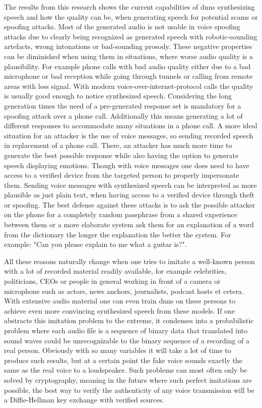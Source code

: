 The results from this research shows the current capabilities of \gls{dnn}s synthesizing speech and how the quality can be, when generating speech for potential scams or spoofing attacks. Most of the generated audio is not usable in voice spoofing attacks due to clearly being recognized as generated speech with robotic-sounding artefacts, wrong intonations or bad-sounding prosody. These negative properties can be diminished when using them in situations, where worse audio quality is a plausibility. For example phone calls with bad audio quality either due to a bad microphone or bad reception while going through tunnels or calling from remote areas with less signal. With modern voice-over-internet-protocol calls the quality is usually good enough to notice synthesized speech. Considering the long generation times the need of a pre-generated response set is mandatory for a spoofing attack over a phone call. Additionally this means generating a lot of different responses to accommodate many situations in a phone call. A more ideal situation for an attacker is the use of voice messages, so sending recorded speech in replacement of a phone call. There, an attacker has much more time to generate the best possible response while also having the option to generate speech displaying emotions. Though with voice messages one does need to have access to a verified device from the targeted person to properly impersonate them. Sending voice messages with synthesized speech can be interpreted as more plausible as just plain text, when having access to a verified device through theft or spoofing. The best defense against these attacks is to ask the possible attacker on the phone for a completely random passphrase from a shared experience between them or a more elaborate system ask them for an explanation of a word from the dictionary the longer the explanation the better the system. For example: "Can you please explain to me what a guitar is?".

All these reasons naturally change when one tries to imitate a well-known person with a lot of recorded material readily available, for example celebrities, politicians, CEOs or people in general working in front of a camera or microphone such as actors, news anchors, journalists, podcast hosts et cetera. With extensive audio material one can even train \gls{dnn}s on these persons to achieve even more convincing synthesized speech from these models. If one abstracts this imitation problem to the extreme, it condenses into a probabilistic problem where each audio file is a sequence of binary data that translated into sound waves could be unrecognizable to the binary sequence of a recording of a real person. Obviously with so many variables it will take a lot of time to produce such results, but at a certain point the fake voice sounds exactly the same as the real voice to a loudspeaker. Such problems can most often only be solved by cryptography, meaning in the future where such perfect imitations are possible, the best way to verify the authenticity of any voice transmission will be a Diffie-Hellman key exchange with verified sources\cite{maurer2000diffie}.